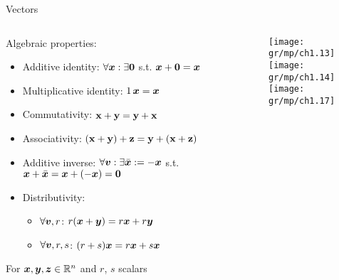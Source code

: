 \begin{frame}{Vectors}
    \begin{columns}[onlytextwidth]
        \begin{column}{0.5\textwidth}
            Algebraic properties:
            \begin{itemize}
                \item Additive identity: $\forall \bm{x} : \exists \bm{0}$ s.t. $\bm{x} + \bm{0} = \bm{x}$
                \item Multiplicative identity: $1\, \bm{x} = \bm{x}$
                \item Commutativity: $\vb{x} + \vb{y} = \vb{y} + \vb{x}$
                \item Associativity: $(\vb{x} + \vb{y}) + \vb{z} = \vb{y} + (\vb{x} + \vb{z})$
                \item Additive inverse: $\forall \bm{v} : \exists \bar{\bm{x}} := -\bm{x}$  s.t. $\bm{x} + \bar{\bm{x}} = \bm{x} + (-\bm{x}) = \bm{0}$
                \item Distributivity:
                      \begin{itemize}
                          \item $\forall \bm{v}, r$: $r(\bm{x} + \bm{y}) = r \bm{x} + r \bm{y}$
                          \item $\forall \bm{v}, r, s$: $(r+s) \bm{x} = r \bm{x} + s \bm{x}$
                      \end{itemize}
            \end{itemize}
            For $\bm{x}, \bm{y}, \bm{z} \in \mathbb{R}^n$ and $r$, $s$ scalars

        \end{column}
        \begin{column}{0.5\textwidth}
            \begin{center}
                \texttt{[image: gr/mp/ch1.13]} \\[7mm]
                \texttt{[image: gr/mp/ch1.14]} \\[7mm]
                \texttt{[image: gr/mp/ch1.17]}
            \end{center}
        \end{column}
    \end{columns}

\end{frame}

